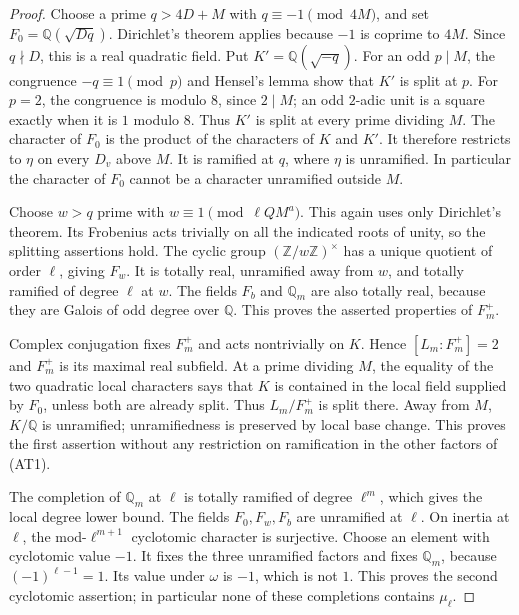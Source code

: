 \begin{proof}
Choose a prime $q>4D+M$ with $q\equiv-1\pmod{4M}$, and set
$F_0=\mathbb Q(\sqrt{Dq})$.  Dirichlet's theorem applies because
$-1$ is coprime to $4M$.  Since $q\nmid D$, this is a real
quadratic field.  Put $K'=\mathbb Q(\sqrt{-q})$.
For an odd $p\mid M$, the congruence $-q\equiv1\pmod p$
and Hensel's lemma show that $K'$ is split at $p$.
For $p=2$, the congruence is modulo $8$, since $2\mid M$;
an odd $2$-adic unit is a square exactly when it is $1$ modulo
$8$.  Thus $K'$ is split at every prime dividing $M$.
The character of $F_0$ is the product of the characters of
$K$ and $K'$.  It therefore restricts to $\eta$ on every
$D_v$ above $M$.  It is ramified at $q$, where $\eta$ is
unramified.  In particular the character of $F_0$ cannot be
a character unramified outside $M$.

Choose $w>q$ prime with
$w\equiv1\pmod{\ell Q M^a}$.  This again uses only Dirichlet's
theorem.  Its Frobenius acts trivially on all the indicated
roots of unity, so the splitting assertions hold.  The cyclic
group $(\mathbb Z/w\mathbb Z)^\times$ has a unique quotient
of order $\ell$, giving $F_w$.  It is totally real, unramified
away from $w$, and totally ramified of degree $\ell$ at $w$.
The fields $F_b$ and $\mathbb Q_m$ are also totally real,
because they are Galois of odd degree over $\mathbb Q$.
This proves the asserted properties of $F_m^+$.

Complex conjugation fixes $F_m^+$ and acts nontrivially on
$K$.  Hence $[L_m:F_m^+]=2$ and $F_m^+$ is its maximal real
subfield.  At a prime dividing $M$, the equality of the two
quadratic local characters says that $K$ is contained in the
local field supplied by $F_0$, unless both are already split.
Thus $L_m/F_m^+$ is split there.  Away from $M$, $K/\mathbb Q$
is unramified; unramifiedness is preserved by local base change.
This proves the first assertion without any restriction on
ramification in the other factors of (AT1).

The completion of $\mathbb Q_m$ at $\ell$ is totally ramified
of degree $\ell^m$, which gives the local degree lower bound.
The fields $F_0,F_w,F_b$ are unramified at $\ell$.  On inertia
at $\ell$, the mod-$\ell^{m+1}$ cyclotomic character is
surjective.  Choose an element with cyclotomic value $-1$.
It fixes the three unramified factors and fixes $\mathbb Q_m$,
because $(-1)^{\ell-1}=1$.  Its value under $\omega$ is $-1$,
which is not $1$.  This proves the second cyclotomic assertion;
in particular none of these completions contains $\mu_\ell$.


\end{proof}
